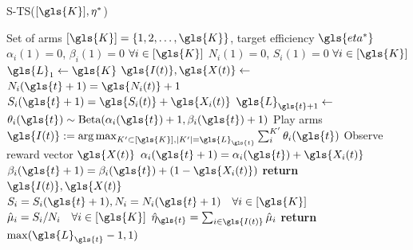\begin{algorithm}
	\footnotesize
	\caption{ \gls{S-TS}($[\gls{K}], \eta^*$)}\label{S-TS} 
	\begin{algorithmic}[1]
		\Require Set of arms
		$[\gls{K}] = \{1,2,\dots, \gls{K}\}$, target efficiency $ \gls{eta^*}$
		\State $\alpha_i(1) = 0$, $\beta_i(1) = 0$ \quad $\forall i \in [ \gls{K}]$ \label{alg1line1}
		\State $N_i(1) = 0$, $S_i(1) = 0$ \quad $\forall i \in [ \gls{K}]$  \label{alg1line2}
		\State $\gls{L}_1 \gets  \gls{K}$ 
		\State $ \gls{I(t)},  \gls{X(t)} \gets $  
		\State $N_i(\gls{t}+1) =  \gls{N_i(t)} + 1$
		\State $S_i(\gls{t}+1) =  \gls{S_i(t)} +  \gls{X_i(t)}$
		\EndFor
		\State $\gls{L}_{\gls{t}+1} \gets$  
		\EndFor
		\Statex~
		 \label{line_mpts}
		\State $\theta_i(\gls{t}) \sim \text{Beta}(\alpha_i(\gls{t})+1, \beta_i(\gls{t})+1)$ \label{betadrawing}
		\EndFor 
		\State Play arms $ \gls{I(t)} := \argmax_{K' \subset [ \gls{K}], |K'| = \gls{L}_{\gls{t}}} \sum_{i}^{K'}\theta_i(\gls{t})$ \label{sorting-theta}
		\State Observe reward vector $ \gls{X(t)}$
		 
		\State $\alpha_i(\gls{t}+1) = \alpha_i(\gls{t}) +  \gls{X_i(t)}$ 
		\State $\beta_i(\gls{t}+1) = \beta_i(\gls{t}) + (1- \gls{X_i(t)})$ 
		\EndFor
		\State \textbf{return} $ \gls{I(t)},  \gls{X(t)}$
		\EndProcedure
		\Statex~
		\State $S_i = S_i(\gls{t}+1), N_i = N_i(\gls{t}+1) \quad \forall i \in [ \gls{K}]$
		\State $\hat{\mu}_i = S_i/N_i \quad \forall i \in [ \gls{K}]$ 
		\State $\hat{\eta}_{\gls{t}} = \sum_{i \in  \gls{I(t)}} \hat{\mu}_i$
		 \textbf{return} $\max(\gls{L}_{\gls{t}} - 1, 1) $
		\EndIf
		\EndProcedure
	\end{algorithmic}
\end{algorithm}

